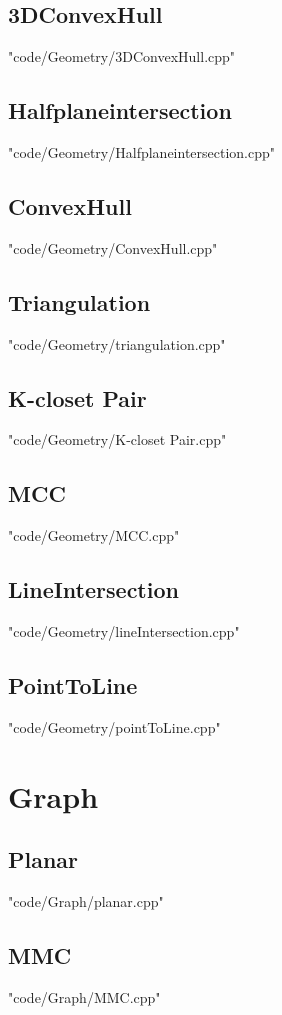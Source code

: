\documentclass [8pt,a4paper,twocolumn]{article}
\begin{document}
\subsection{3DConvexHull}
 {"code/Geometry/3DConvexHull.cpp"}
\subsection{Halfplaneintersection}
 {"code/Geometry/Halfplaneintersection.cpp"}
\subsection{ConvexHull}
 {"code/Geometry/ConvexHull.cpp"}
\subsection{Triangulation}
 {"code/Geometry/triangulation.cpp"}
\subsection{K-closet Pair}
 {"code/Geometry/K-closet Pair.cpp"}
\subsection{MCC}
 {"code/Geometry/MCC.cpp"}
\subsection{LineIntersection}
 {"code/Geometry/lineIntersection.cpp"}
\subsection{PointToLine}
 {"code/Geometry/pointToLine.cpp"}
\section{Graph}
\subsection{Planar}
 {"code/Graph/planar.cpp"}
\subsection{MMC}
 {"code/Graph/MMC.cpp"}
\end{document}
